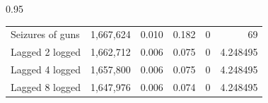 \documentclass[12pt,letterpaper]{article}
\begin{document}
\begin{table}[h!]
\begin{spacing}{0.95}
\begin{tabular}{lrrrrr}
												
	Seizures of guns	&	 1,667,624 	&	0.010	&	0.182	&	0	&	69	 \\
	\hspace{1em} Lagged 2 logged	&	 1,662,712 	&	0.006	&	0.075	&	0	&	4.248495	 \\
	\hspace{1em} Lagged 4 logged	&	 1,657,800 	&	0.006	&	0.075	&	0	&	4.248495	 \\
	\hspace{1em} Lagged 8 logged	&	 1,647,976 	&	0.006	&	0.074	&	0	&	4.248495	 \\
												

\hline
\end{tabular}
\end{spacing}
\end{table}
\end{document}

